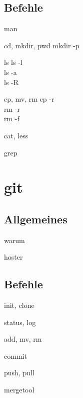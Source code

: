 \documentclass{beamer}
\begin{document}
    \subsection{Befehle}
      \begin{frame}{man}
      \end{frame}
      \begin{frame}{cd, mkdir, pwd}
        mkdir -p
      \end{frame}
      \begin{frame}{ls}
        ls -l\\
        ls -a\\
        ls -R
      \end{frame}
      \begin{frame}{cp, mv, rm}
        cp -r\\
        rm -r\\
        rm -f
      \end{frame}
      \begin{frame}{cat, less}
      \end{frame}
      \begin{frame}{grep}
      \end{frame}
  \section{git}
    \subsection{Allgemeines}
      \begin{frame}{warum}
      \end{frame}
      \begin{frame}{hoster}
      \end{frame}
    \subsection{Befehle}
      \begin{frame}{init, clone}
      \end{frame}
      \begin{frame}{status, log}
      \end{frame}
      \begin{frame}{add, mv, rm}
      \end{frame}
      \begin{frame}{commit}
      \end{frame}
      \begin{frame}{push, pull}
      \end{frame}
      \begin{frame}{mergetool}
      \end{frame}
\end{document}
